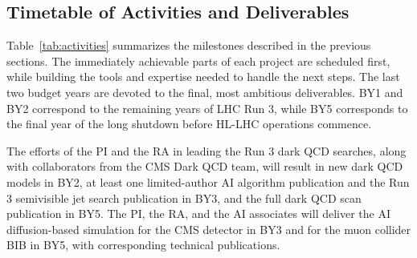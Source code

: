\subsection{Timetable of Activities and Deliverables}

Table~\ref{tab:activities} summarizes the milestones described in the previous sections.
The immediately achievable parts of each project are scheduled first,
while building the tools and expertise needed to handle the next steps.
The last two budget years are devoted to the final, most ambitious deliverables.
BY1 and BY2 correspond to the remaining years of LHC Run 3, while BY5 corresponds to the final year of the long shutdown before HL-LHC operations commence.

The efforts of the PI and the RA in leading the Run 3 dark QCD searches, along with collaborators from the CMS Dark QCD team,
will result in new dark QCD models in BY2, at least one limited-author AI algorithm publication and the Run 3 semivisible jet search publication in BY3, and the full dark QCD scan publication in BY5.
The PI, the RA, and the AI associates will deliver the AI diffusion-based simulation for the CMS detector in BY3
and for the muon collider BIB in BY5, with corresponding technical publications.

